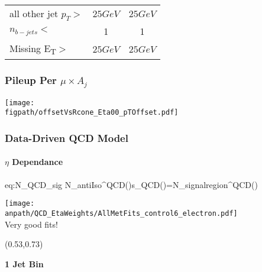 \begin{frame}
{\begin{table}[tb]
\begin{tabular}{|l|c|c|}
				all other jet $p_{T}>$ & $25\unit{GeV}$ & $25\unit{GeV}$\\
				$n_{b-jets}<$ & 1 & 1 \\
				Missing E\textsubscript{T}$>$ & $25\unit{GeV}$ & $25\unit{GeV}$\\ \hline
			\end{tabular}
		\end{table}
	}
	\vspace*{0.15cm}
\end{frame}

\begin{frame}
	\frametitle{Pileup Per ${\mu\times}A_{j}$}
	\vspace*{-0.24cm}
	\begin{center}
		\texttt{[image: \\figpath/offsetVsRcone\_Eta00\_pTOffset.pdf]}
	\end{center}
\end{frame}

\begin{frame}
	\frametitle{Data-Driven QCD Model}
	\framesubtitle{$\eta$ Dependance}
	\vspace*{-0.60cm}
	\begin{center}
		\begin{aeq}{eq:N_QCD_sig}
			N_{antiIso}^{QCD}\left(\eta\right)s_{QCD}\left(\eta\right)=N_{signal\text{ }region}^{QCD}\left(\eta\right)
		\end{aeq}
		\texttt{[image: \\anpath/QCD\_EtaWeights/AllMetFits\_control6\_electron.pdf]}\\
		Very good fits!\\
	\end{center}
	\begin{textblock}{0.30}(0.53,0.73)
		\begin{block}{}
			\textbf{\Huge{1 Jet Bin}}
		\end{block}
	\end{textblock}
\end{frame}

